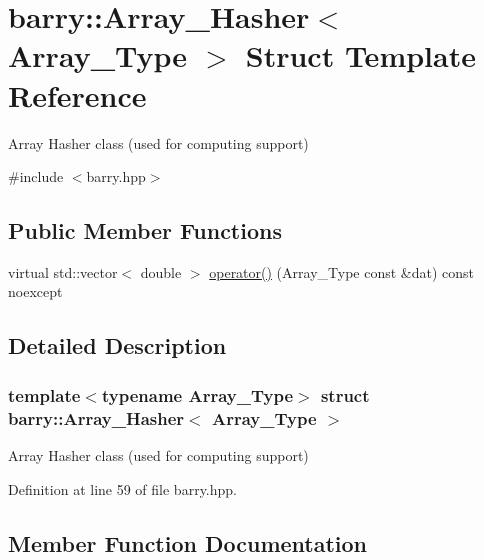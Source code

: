 \hypertarget{structbarry_1_1_array___hasher}{}\section{barry\+:\+:Array\+\_\+\+Hasher$<$ Array\+\_\+\+Type $>$ Struct Template Reference}
\label{structbarry_1_1_array___hasher}


Array Hasher class (used for computing support)  




{\ttfamily \#include $<$barry.\+hpp$>$}

\subsection*{Public Member Functions}
\begin{DoxyCompactItemize}
\item 
virtual std\+::vector$<$ double $>$ \hyperlink{structbarry_1_1_array___hasher_aecc53fb04a3bc5cdcf9208c8a09a30cf}{operator()} (Array\+\_\+\+Type const \&dat) const noexcept
\end{DoxyCompactItemize}


\subsection{Detailed Description}
\subsubsection*{template$<$typename Array\+\_\+\+Type$>$\newline
struct barry\+::\+Array\+\_\+\+Hasher$<$ Array\+\_\+\+Type $>$}

Array Hasher class (used for computing support) 



Definition at line 59 of file barry.\+hpp.



\subsection{Member Function Documentation}
\mbox{\label{structbarry_1_1_array___hasher_aecc53fb04a3bc5cdcf9208c8a09a30cf}} 
